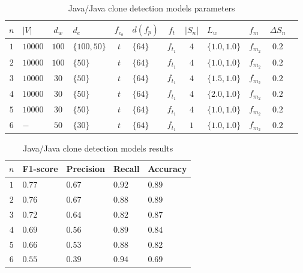 %
\begin{table}
  \caption{\label{tab:java-java-model-params}Java/Java clone detection
    models parameters}
  \begin{center}
    \begin{tabularx}{\linewidth}{c Y c Y c Y c c Y Y c c}
      \toprule
      $n$ & $|V|$ & $d_w$ & $d_e$ & $f_{e_b}$ & $d(f_p)$ & $f_t$ & $|S_n|$ & $L_w$ & $f_m$ & $\Delta S_n$\\
      \toprule
      $1$ & $10000$ & $100$ & $\{100,50\}$ & $t$ & $\{64\}$ & $f_{t_1}$ & $4$ & $\{1.0,1.0\}$ & $f_{m_2}$ & $0.2$\\
      $2$ & $10000$ & $100$ & $\{50\}$ & $t$ & $\{64\}$ & $f_{t_1}$ & $4$ & $\{1.0,1.0\}$ & $f_{m_2}$ & $0.2$\\
      $3$ & $10000$ & $30$ & $\{50\}$ & $t$ & $\{64\}$ & $f_{t_1}$ & $4$ & $\{1.5,1.0\}$ & $f_{m_2}$ & $0.2$\\
      $4$ & $10000$ & $30$ & $\{50\}$ & $t$ & $\{64\}$ & $f_{t_1}$ & $4$ & $\{2.0,1.0\}$ & $f_{m_2}$ & $0.2$\\
      $5$ & $10000$ & $30$ & $\{50\}$ & $t$ & $\{64\}$ & $f_{t_1}$ & $4$ & $\{1.0,1.0\}$ & $f_{m_2}$ & $0.2$\\
      $6$ & $-$ & $50$ & $\{30\}$ & $t$ & $\{64\}$ & $f_{t_1}$ & $1$ & $\{1.0,1.0\}$ & $f_{m_2}$ & $0.2$\\
      \bottomrule
    \end{tabularx}
  \end{center}
\end{table}
%
\begin{table}
  \caption{\label{tab:java-java-model-results}Java/Java clone detection
    models results}
  \begin{center}
    \begin{tabularx}{\linewidth}{c Y Y Y Y}
      \toprule
      $n$ & F1-score & Precision & Recall & Accuracy\\
      \toprule
      $1$ & $0.77$ & $0.67$ & $0.92$ & $0.89$\\
      $2$ & $0.76$ & $0.67$ & $0.88$ & $0.89$\\
      $3$ & $0.72$ & $0.64$ & $0.82$ & $0.87$\\
      $4$ & $0.69$ & $0.56$ & $0.89$ & $0.84$\\
      $5$ & $0.66$ & $0.53$ & $0.88$ & $0.82$\\
      $6$ & $0.55$ & $0.39$ & $0.94$ & $0.69$\\
      \bottomrule
    \end{tabularx}
  \end{center}
\end{table}

